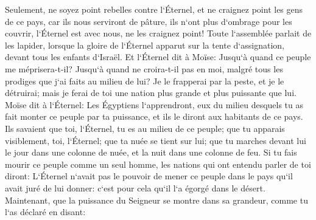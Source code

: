 \verse Seulement, ne soyez point rebelles contre l`Éternel, et ne craignez point les gens de ce pays, car ils nous serviront de pâture, ils n`ont plus d`ombrage pour les couvrir, l`Éternel est avec nous, ne les craignez point! 
\verse Toute l`assemblée parlait de les lapider, lorsque la gloire de l`Éternel apparut sur la tente d`assignation, devant tous les enfants d`Israël. 
\verse Et l`Éternel dit à Moïse: Jusqu`à quand ce peuple me méprisera-t-il? Jusqu`à quand ne croira-t-il pas en moi, malgré tous les prodiges que j`ai faits au milieu de lui? 
\verse Je le frapperai par la peste, et je le détruirai; mais je ferai de toi une nation plus grande et plus puissante que lui. 
\verse Moïse dit à l`Éternel: Les Égyptiens l`apprendront, eux du milieu desquels tu as fait monter ce peuple par ta puissance, 
\verse et ils le diront aux habitants de ce pays. Ils savaient que toi, l`Éternel, tu es au milieu de ce peuple; que tu apparais visiblement, toi, l`Éternel; que ta nuée se tient sur lui; que tu marches devant lui le jour dans une colonne de nuée, et la nuit dans une colonne de feu. 
\verse Si tu fais mourir ce peuple comme un seul homme, les nations qui ont entendu parler de toi diront: 
\verse L`Éternel n`avait pas le pouvoir de mener ce peuple dans le pays qu`il avait juré de lui donner: c`est pour cela qu`il l`a égorgé dans le désert. 
\verse Maintenant, que la puissance du Seigneur se montre dans sa grandeur, comme tu l`as déclaré en disant: 
